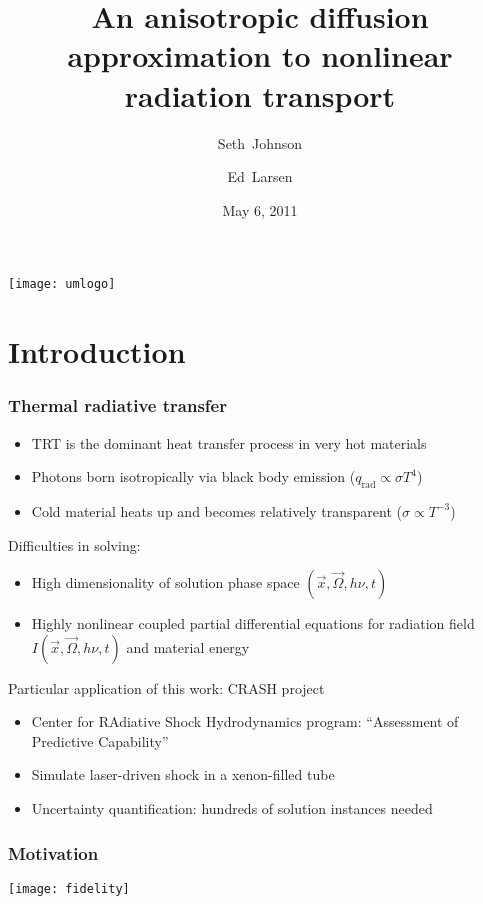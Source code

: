\documentclass{beamer}
\title[ORNL Seminar]%
{An anisotropic diffusion approximation to nonlinear radiation transport}
\author[SRJ, EWL]{Seth~Johnson \and Ed~Larsen}
\institute[UMich]{
University of Michigan, Ann Arbor
}
\date[5/6/2011]{May 6, 2011}
\begin{document}

\begin{frame}
\titlepage
\begin{center}
  \texttt{[image: umlogo]}
\end{center}
\end{frame}

\section{Introduction}
\begin{frame}
  \frametitle{Thermal radiative transfer}
  \begin{itemize}
    \item TRT is the dominant heat transfer process in very hot materials
    \item Photons born isotropically via black body emission
      ($q_\text{rad} \propto \sigma T^4$)
    \item Cold material heats up and becomes relatively transparent
      ($\sigma\propto T^{-3}$)
  \end{itemize}

  Difficulties in solving:
  \begin{itemize}
    \item High dimensionality of solution phase space $(\vec{x}, \vec{\Omega},
      h\nu, t)$
    \item Highly nonlinear coupled partial differential equations for radiation
      field $I(\vec{x}, \vec{\Omega}, h\nu, t)$ and material energy
  \end{itemize}

  Particular application of this work: CRASH project
  \begin{itemize}
    \item Center for RAdiative Shock Hydrodynamics program: ``Assessment
      of Predictive Capability''
    \item Simulate laser-driven shock in a xenon-filled tube
    \item Uncertainty quantification: hundreds of solution instances needed
  \end{itemize}
\end{frame}

\begin{frame}
  \frametitle{Motivation}
\begin{center}
  \texttt{[image: fidelity]}
\end{center}
\end{frame}
\end{document}
